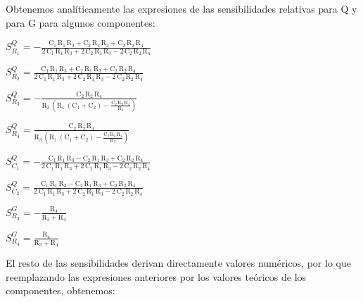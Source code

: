 \documentclass[../tc_tpfinal_main.tex]{subfiles}
\begin{document}
Obtenemos analíticamente las expresiones de las sensibilidades relativas para Q y para G para algunos componentes: \par

$S^{Q}_{R_1} = -\frac{\mathrm{C_1}\, \mathrm{R_1}\, \mathrm{R_3} + \mathrm{C_2}\, \mathrm{R_1}\, \mathrm{R_3} + \mathrm{C_2}\, \mathrm{R_2}\, \mathrm{R_4}}{2\, \mathrm{C_1}\, \mathrm{R_1}\, \mathrm{R_3} + 2\, \mathrm{C_2}\, \mathrm{R_1}\, \mathrm{R_3} - 2\, \mathrm{C_2}\, \mathrm{R_2}\, \mathrm{R_4}}
$ \par
$S^{Q}_{R_2} = \frac{\mathrm{C_1}\, \mathrm{R_1}\, \mathrm{R_3} + \mathrm{C_2}\, \mathrm{R_1}\, \mathrm{R_3} + \mathrm{C_2}\, \mathrm{R_2}\, \mathrm{R_4}}{2\, \mathrm{C_1}\, \mathrm{R_1}\, \mathrm{R_3} + 2\, \mathrm{C_2}\, \mathrm{R_1}\, \mathrm{R_3} - 2\, \mathrm{C_2}\, \mathrm{R_2}\, \mathrm{R_4}}
$\par
$S^{Q}_{R_3} = -\frac{\mathrm{C_2}\, \mathrm{R_2}\, \mathrm{R_4}}{\mathrm{R_3}\, \left(\mathrm{R_1}\, \left(\mathrm{C_1} + \mathrm{C_2}\right) - \frac{\mathrm{C_2}\, \mathrm{R_2}\, \mathrm{R_4}}{\mathrm{R_3}}\right)}
$\par
$S^{Q}_{R_4} = \frac{\mathrm{C_2}\, \mathrm{R_2}\, \mathrm{R_4}}{\mathrm{R_3}\, \left(\mathrm{R_1}\, \left(\mathrm{C_1} + \mathrm{C_2}\right) - \frac{\mathrm{C_2}\, \mathrm{R_2}\, \mathrm{R_4}}{\mathrm{R_3}}\right)}
$\par
$S^{Q}_{C_1} = -\frac{\mathrm{C_1}\, \mathrm{R_1}\, \mathrm{R_3} - \mathrm{C_2}\, \mathrm{R_1}\, \mathrm{R_3} + \mathrm{C_2}\, \mathrm{R_2}\, \mathrm{R_4}}{2\, \mathrm{C_1}\, \mathrm{R_1}\, \mathrm{R_3} + 2\, \mathrm{C_2}\, \mathrm{R_1}\, \mathrm{R_3} - 2\, \mathrm{C_2}\, \mathrm{R_2}\, \mathrm{R_4}}
$\par
$S^{Q}_{C_2} = \frac{\mathrm{C_1}\, \mathrm{R_1}\, \mathrm{R_3} - \mathrm{C_2}\, \mathrm{R_1}\, \mathrm{R_3} + \mathrm{C_2}\, \mathrm{R_2}\, \mathrm{R_4}}{2\, \mathrm{C_1}\, \mathrm{R_1}\, \mathrm{R_3} + 2\, \mathrm{C_2}\, \mathrm{R_1}\, \mathrm{R_3} - 2\, \mathrm{C_2}\, \mathrm{R_2}\, \mathrm{R_4}}
$ \par

$S^G_{R_3} = -\frac{\mathrm{R_4}}{\mathrm{R_3} + \mathrm{R_4}}$\par
$S^G_{R_4} = \frac{\mathrm{R_4}}{\mathrm{R_3} + \mathrm{R_4}}$\par

El resto de las sensibilidades derivan directamente valores numéricos, por lo que reemplazando las expresiones anteriores por los valores teóricos de los componentes, obtenemos:\par
\end{document}
